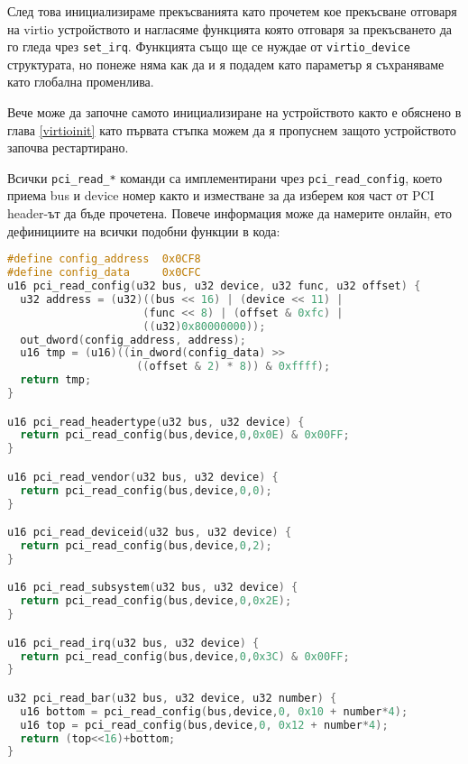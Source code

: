След това инициализираме прекъсванията като прочетем кое прекъсване отговаря на virtio устройството и нагласяме функцията която отговаря за прекъсването да го гледа чрез {\tt set\_irq}. Функцията също ще се нуждае от {\tt virtio\_device} структурата, но понеже няма как да и я подадем като параметър я съхраняваме като глобална променлива.

Вече може да започне самото инициализиране на устройството както е обяснено в глава \ref{virtioinit} като първата стъпка можем да я пропуснем защото устройството започва рестартирано.

Всички {\tt pci\_read\_*} команди са имплементирани чрез {\tt pci\_read\_config}, което приема bus и device номер както и изместване за да изберем коя част от PCI header-ът да бъде прочетена. Повече информация може да намерите онлайн\parencite{pciheader}, ето дефинициите на всички подобни функции в кода:
\begin{lstlisting}[language=C]
#define config_address  0x0CF8
#define config_data     0x0CFC
u16 pci_read_config(u32 bus, u32 device, u32 func, u32 offset) {
  u32 address = (u32)((bus << 16) | (device << 11) |
                     (func << 8) | (offset & 0xfc) |
                     ((u32)0x80000000));
  out_dword(config_address, address);
  u16 tmp = (u16)((in_dword(config_data) >>
                    ((offset & 2) * 8)) & 0xffff);
  return tmp;
}

u16 pci_read_headertype(u32 bus, u32 device) {
  return pci_read_config(bus,device,0,0x0E) & 0x00FF;
}

u16 pci_read_vendor(u32 bus, u32 device) {
  return pci_read_config(bus,device,0,0);
}

u16 pci_read_deviceid(u32 bus, u32 device) {
  return pci_read_config(bus,device,0,2);
}

u16 pci_read_subsystem(u32 bus, u32 device) {
  return pci_read_config(bus,device,0,0x2E);
}

u16 pci_read_irq(u32 bus, u32 device) {
  return pci_read_config(bus,device,0,0x3C) & 0x00FF;
}

u32 pci_read_bar(u32 bus, u32 device, u32 number) {
  u16 bottom = pci_read_config(bus,device,0, 0x10 + number*4);
  u16 top = pci_read_config(bus,device,0, 0x12 + number*4);
  return (top<<16)+bottom;
}
\end{lstlisting}

